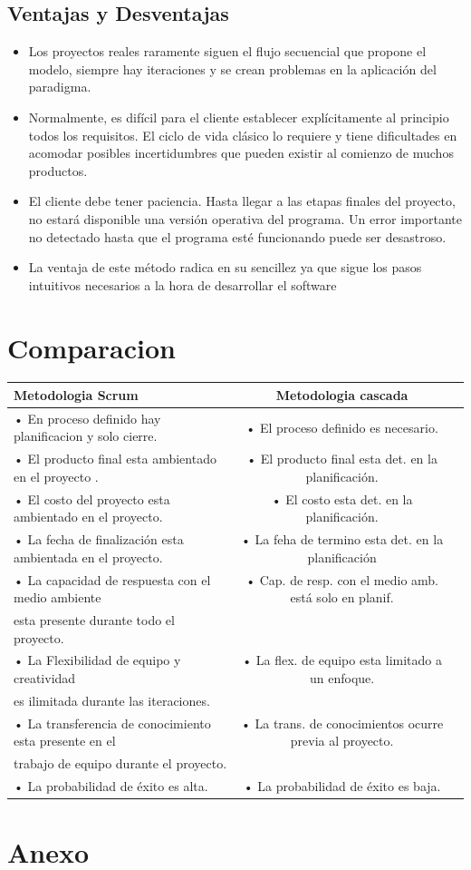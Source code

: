 \documentclass[10pt]{article}
\begin{document}
\subsection{Ventajas y Desventajas}
\begin{itemize}
\item 	Los proyectos reales raramente siguen el flujo secuencial que propone el modelo, siempre hay iteraciones y se crean problemas en la aplicación del paradigma.
\item 	Normalmente, es difícil para el cliente establecer explícitamente al principio  todos los requisitos. El ciclo de vida clásico lo requiere y tiene dificultades en acomodar posibles incertidumbres que pueden existir al comienzo de muchos productos.
\item 	El cliente debe tener paciencia. Hasta llegar a las etapas finales del proyecto, no estará disponible una versión operativa del programa. Un error importante no detectado hasta que el programa esté funcionando puede ser desastroso.
\item La ventaja de este método radica en su sencillez ya que sigue los pasos intuitivos necesarios a la hora de desarrollar el software
\end{itemize}




\newpage
\section{Comparacion}


\begin{tabular}{|lc|l|} \hline
\multicolumn{1}{|p{5cm}|}{\centering %
Metodologia Scrum} & \multicolumn{1}{|p{5cm}|}{\centering %
Metodologia cascada} \tabularnewline \hline
 • En proceso definido hay planificacion y solo cierre.   &  • El proceso definido es necesario.\\
 • El producto final esta ambientado en el proyecto . &  • El producto final esta det. en la planificación.\\
 • El costo del proyecto esta ambientado en el proyecto. & • El costo esta det. en la planificación. \\
 • La fecha de finalización esta ambientada en el proyecto. & • La feha de termino esta det. en la planificación \\
 • La capacidad de respuesta con el medio ambiente & • Cap. de resp. con el medio amb. está  solo en planif.\\
      esta presente durante todo el proyecto.\\
 • La Flexibilidad de equipo y creatividad  & • La flex. de equipo esta limitado a un enfoque.\\
     es ilimitada durante las iteraciones.\\
 • La transferencia de conocimiento esta presente en el &• La trans. de conocimientos ocurre previa al proyecto.\\
      trabajo de equipo durante el proyecto.\\
 • La probabilidad de éxito es alta. & • La probabilidad de éxito es baja.\\
 \hline
\end{tabular}




\section{Anexo}
\end{document}
